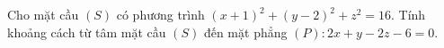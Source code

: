 \begin{bt}%
	Cho mặt  cầu $(S)$ có phương trình $(x+1)^2+(y-2)^2+z^2=16$. Tính khoảng cách từ tâm mặt cầu $(S)$ đến mặt phẳng $(P)\colon 2 x+y-2 z-6=0$.
\end{bt}
